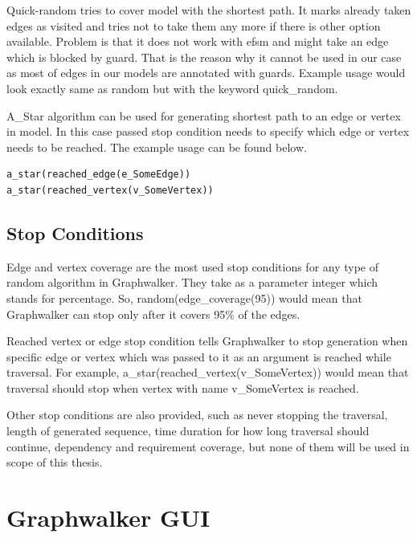 \par
Quick-random tries to cover model with the shortest path. It marks already taken edges 
as visited and tries not to take them any more if there is other option available. Problem is that it does not work with \acrshort{efsm} and might take an edge which is blocked by guard. That is the reason why it cannot be used in our case as most of edges in our models are annotated with guards. Example usage would look exactly same as random but with the keyword quick\_random.

\par
A\_Star algorithm can be used for generating shortest path to an edge or vertex in model. In this case passed stop condition needs to specify which edge or vertex needs to be reached. The example usage can be found below.

\begin{lstlisting}
a_star(reached_edge(e_SomeEdge))
a_star(reached_vertex(v_SomeVertex))
\end{lstlisting}

\subsection{Stop Conditions}
\par
Edge and vertex coverage are the most used stop conditions for any type of random algorithm in Graphwalker. They take as a parameter integer which stands for percentage. So, random(edge\_coverage(95)) would mean that Graphwalker can stop only after it covers 95\% of the edges.

\par
Reached vertex or edge stop condition tells Graphwalker to stop generation when specific edge or vertex which was passed to it as an argument is reached while traversal. For example, a\_star(reached\_vertex(v\_SomeVertex)) would mean that traversal should stop when vertex with name v\_SomeVertex is reached.

\par
Other stop conditions are also provided, such as never stopping the traversal, length of generated sequence, time duration for how long traversal should continue, dependency and requirement coverage, but none of them will be used in scope of this thesis.

\section{Graphwalker GUI}

